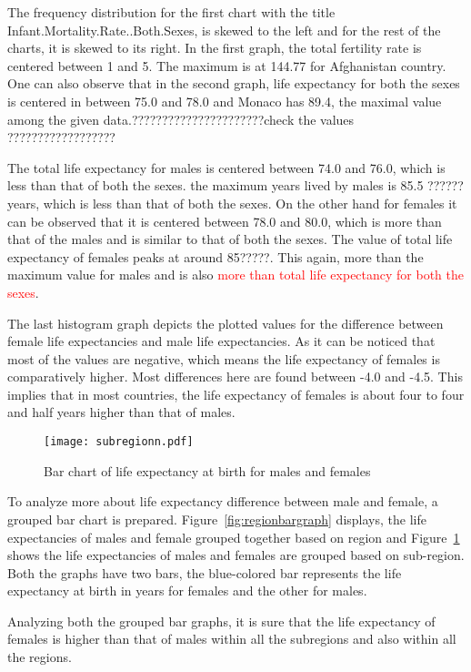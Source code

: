 \documentclass[12 pt]{scrartcl}
\newcommand{\red}{\textcolor{red}}
\begin{document}
	The frequency distribution for the first chart with the title Infant.Mortality.Rate..Both.Sexes, is skewed to the left and for the rest of the charts, it is skewed to its right. In the first graph, the total fertility rate is centered between 1 and 5. The maximum is at 144.77 for Afghanistan country. One can also observe that in the second graph, life expectancy for both the sexes is centered in between 75.0 and 78.0 and Monaco has 89.4, the maximal value among the given data.??????????????????????check the values ??????????????????
	
	The total life expectancy for males is centered between 74.0 and 76.0, which is less than that of both the sexes. the maximum years lived by males is 85.5 ??????years, which is less than that of both the sexes. On the other hand for females it can be observed that it is centered between 78.0 and 80.0, which is more than that of the males and is similar to that of both the sexes. The value of total life expectancy of females peaks at around 85?????. This again, more than the maximum value for males and is also \red{more than total life expectancy for both the sexes}.
	
	The last histogram graph depicts the plotted values for the difference between female life expectancies and male life expectancies. As it can be noticed that most of the values are negative, which means the life expectancy of females is comparatively higher. Most differences here are found between -4.0 and -4.5. This implies that in most countries, the life expectancy of females is about four to four and half years higher than that of males.
	
	
	\begin{figure}[h!]
		\centering
		\texttt{[image: subregionn.pdf]}
		\caption{Bar chart of life expectancy at birth for males and females}
		\label{fig:subregionbargraph}
	\end{figure}
	
	To analyze more about life expectancy difference between male and female, a grouped bar chart is prepared. Figure~\ref{fig:regionbargraph} displays, the life expectancies of males and female grouped together based on region and Figure~\ref{fig:subregionbargraph} shows the life expectancies of males and females are grouped based on sub-region.  Both the graphs have two bars, the blue-colored bar represents the life expectancy at birth in years for females and the other for males.
	
	Analyzing both the grouped bar graphs, it is sure that the life expectancy of females is higher than that of males within all the subregions and also within all the regions.
	
\end{document}
